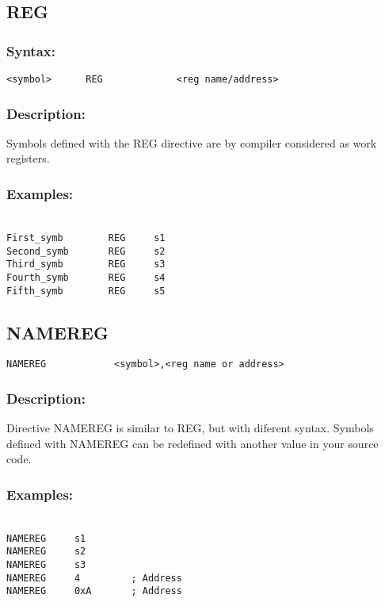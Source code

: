{    \subsection{REG}
        \subsubsection{Syntax:}
            \verb'<symbol>      REG             <reg name/address>'
            
        \subsubsection{Description:}
        Symbols defined with the REG directive are by compiler considered as work registers.

        \subsubsection{Examples:}
            {
            ~\\
            \usecodefont
            \verb'First_symb        REG     s1'\\
            \verb'Second_symb       REG     s2'\\
            \verb'Third_symb        REG     s3'\\
            \verb'Fourth_symb       REG     s4'\\
            \verb'Fifth_symb        REG     s5'\\
            }
            
        \subsection{NAMEREG}
            \verb'NAMEREG            <symbol>,<reg name or address> '
            
        \subsubsection{Description:}
        Directive NAMEREG is similar to REG, but with diferent syntax. Symbols defined with NAMEREG can be redefined with another value in your source
        code.

        \subsubsection{Examples:}
        {
            ~\\
            \usecodefont
            \verb'NAMEREG     s1'\\
            \verb'NAMEREG     s2'\\
            \verb'NAMEREG     s3'\\
            \verb'NAMEREG     4         ; Address'\\
            \verb'NAMEREG     0xA       ; Address'\\
        }


}
